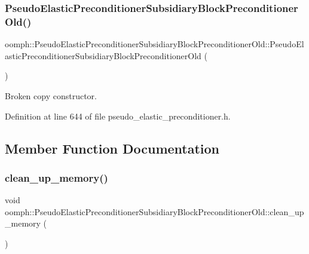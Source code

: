 \subsubsection{\texorpdfstring{Pseudo\+Elastic\+Preconditioner\+Subsidiary\+Block\+Preconditioner\+Old()}{PseudoElasticPreconditionerSubsidiaryBlockPreconditionerOld()}\hspace{0.1cm}{\footnotesize\ttfamily [2/2]}}
{\footnotesize\ttfamily oomph\+::\+Pseudo\+Elastic\+Preconditioner\+Subsidiary\+Block\+Preconditioner\+Old\+::\+Pseudo\+Elastic\+Preconditioner\+Subsidiary\+Block\+Preconditioner\+Old (\begin{DoxyParamCaption}\item[{const \hyperlink{classoomph_1_1PseudoElasticPreconditionerSubsidiaryBlockPreconditionerOld}{Pseudo\+Elastic\+Preconditioner\+Subsidiary\+Block\+Preconditioner\+Old} \&}]{ }\end{DoxyParamCaption})\hspace{0.3cm}{\ttfamily [inline]}}



Broken copy constructor. 



Definition at line 644 of file pseudo\+\_\+elastic\+\_\+preconditioner.\+h.



\subsection{Member Function Documentation}
\mbox{\label{classoomph_1_1PseudoElasticPreconditionerSubsidiaryBlockPreconditionerOld_a8bb2215735df1a583b4bc1b92bded1e6}} 
\subsubsection{\texorpdfstring{clean\+\_\+up\+\_\+memory()}{clean\_up\_memory()}}
{\footnotesize\ttfamily void oomph\+::\+Pseudo\+Elastic\+Preconditioner\+Subsidiary\+Block\+Preconditioner\+Old\+::clean\+\_\+up\+\_\+memory (\begin{DoxyParamCaption}{ }\end{DoxyParamCaption})}



